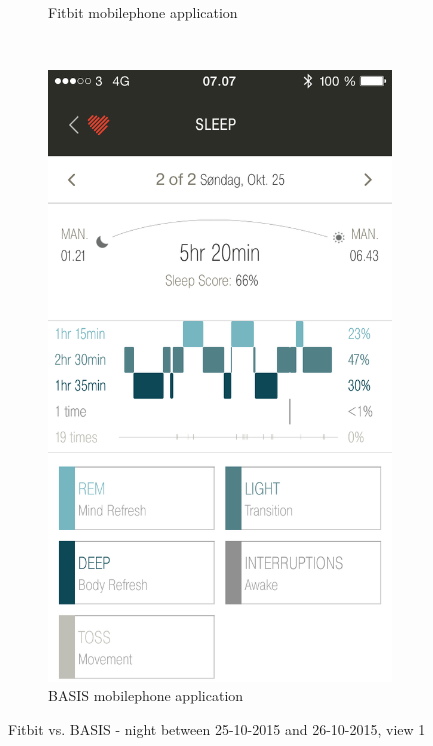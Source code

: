 \documentclass[12pt]{article} %
\begin{document}
\begin{figure}[H]
\begin{subfigure}[b]{0.45\textwidth}
        \caption{Fitbit mobilephone application}
        \label{fig:fitbit1}
    \end{subfigure}
    ~ %
    \begin{subfigure}[b]{0.45\textwidth}
        \includegraphics[width=\textwidth]{img/26-10-basis}
        \caption{BASIS mobilephone application}
        \label{fig:basis1}
    \end{subfigure}
    \caption{Fitbit vs. BASIS - night between 25-10-2015 and 26-10-2015, view 1}
    \label{fig:pilot1}
\end{figure}
\end{document}
